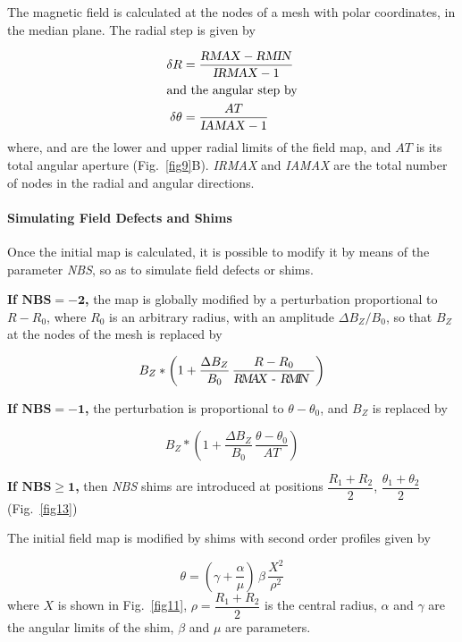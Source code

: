 \noindent The magnetic field is calculated at the nodes of a mesh with polar
coordinates, in the median plane.  The radial step is given by 

 \begin{align*}
	 \delta R & = \dfrac{\text{\textsl{RMAX}} - \text{\textsl{RMIN}} }{\text{\textsl{IRMAX}}-1} \\
	\intertext{and the angular step by} 
	 \delta \theta  & = \dfrac{AT }{\text{\textsl{IAMAX}}-1} 
 \end{align*}
\noindent where, \RMIN  and \RMAX   are the lower and upper
radial limits of the field map, and $ AT $ is its total angular aperture (Fig.~\ref{fig9}B).  
 \textsl{IRMAX}  and \textsl{IAMAX} are 
the total number of nodes in the radial and angular directions. 

\paragraph{Simulating Field Defects and Shims }

\noindent Once the initial map is calculated, it is possible to modify it by
means of the parameter \textsl{NBS}, so as to simulate field defects or shims. 
\bigskip

\noindent\textbf{If $\mathbf{NBS = - 2}$,} the map is globally modified by a
perturbation proportional to $ R-R_0 $, 
where $ R_0 $ is an arbitrary radius, with an amplitude $ \Delta B_Z/B_0 $, so
that $ B_Z $ at the nodes of the mesh is replaced by 

$$ B_Z  \ast   \left(1+ \frac{\Delta B_Z }{ B_0}\, \frac{R-R_0 }{\text{\textsl{R\!M\!A\!X }- \textsl{R\!M\!I\!N }}} \right) $$

\noindent\textbf{If  $\mathbf{NBS =  - 1}$,} the perturbation is proportional to
$ \theta -\theta_ 0 $, and $ B_Z $ is replaced by 

$$ B_Z \ast  \left(1+ \frac{\Delta B_Z }{ B_0} \, \frac{\theta -\theta_ 0 }{ AT}\right) $$

\noindent\textbf{If  $\mathbf{NBS \geq 1}$,} then \textsl{NBS} shims are introduced at
positions $ \dfrac{ R_1+R_2 }{ 2}$, $\dfrac{\theta_ 1+\theta_ 2 }{ 2} $ 
(Fig.~\ref{fig13})~\cite{Biblio13}   %

\noindent The initial field map is modified by shims with second order profiles given by 

$$ \theta  = \left(\gamma  + \frac{\alpha }{ \mu} \right) \,\beta\, \frac{X^2 }{\rho^ 2} $$
%
 where $ X $ is shown in  Fig.~\ref{fig11}, 
 $\rho = \dfrac{R_1+R_2 }{ 2} $ is the central radius, $\alpha$ and $\gamma$ are the angular 
 limits of the shim, $\beta$ and $\mu$ are parameters. 
 
